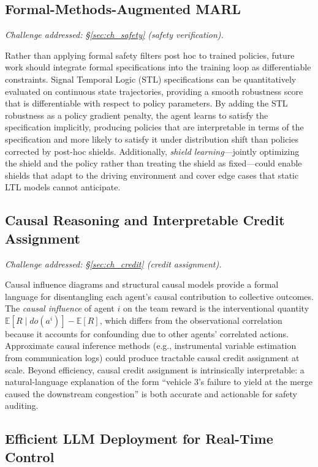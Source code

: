 \documentclass[12pt, a4paper]{article}
\begin{document}
\subsection{Formal-Methods-Augmented MARL}

\textit{Challenge addressed: \S\ref{sec:ch_safety} (safety verification).}

Rather than applying formal safety filters post hoc to trained policies,
future work should integrate formal specifications into the training loop as
differentiable constraints.  Signal Temporal Logic (STL) specifications can
be quantitatively evaluated on continuous state trajectories, providing a
smooth robustness score that is differentiable with respect to policy
parameters.  By adding the STL robustness as a policy gradient penalty,
the agent learns to satisfy the specification implicitly, producing policies
that are interpretable in terms of the specification and more likely to
satisfy it under distribution shift than policies corrected by post-hoc
shields.  Additionally, \emph{shield learning}---jointly optimizing the
shield and the policy rather than treating the shield as fixed---could
enable shields that adapt to the driving environment and cover edge cases
that static LTL models cannot anticipate.

\subsection{Causal Reasoning and Interpretable Credit Assignment}

\textit{Challenge addressed: \S\ref{sec:ch_credit} (credit assignment).}

Causal influence diagrams and structural causal models provide a formal
language for disentangling each agent's causal contribution to collective
outcomes.  The \emph{causal influence} of agent $i$ on the team reward is
the interventional quantity $\mathbb{E}[R \mid do(a^i)] - \mathbb{E}[R]$,
which differs from the observational correlation because it accounts for
confounding due to other agents' correlated actions.  Approximate causal
inference methods (e.g., instrumental variable estimation from communication
logs) could produce tractable causal credit assignment at scale.  Beyond
efficiency, causal credit assignment is intrinsically interpretable: a
natural-language explanation of the form ``vehicle 3's failure to yield
at the merge caused the downstream congestion'' is both accurate and
actionable for safety auditing.

\subsection{Efficient LLM Deployment for Real-Time Control}
\end{document}
